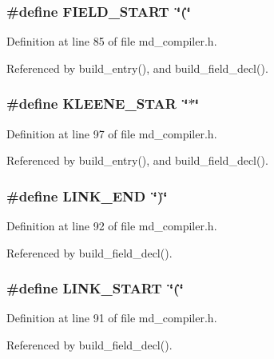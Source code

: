 \subsubsection{\setlength{\rightskip}{0pt plus 5cm}\#define FIELD\_\-START~\char`\"{}(\char`\"{}}\label{md__compiler_8h_7fbfa64753ca50463cbe92c1f585fa3b}




Definition at line 85 of file md\_\-compiler.h.

Referenced by build\_\-entry(), and build\_\-field\_\-decl().
\subsubsection{\setlength{\rightskip}{0pt plus 5cm}\#define KLEENE\_\-STAR~\char`\"{}$\ast$\char`\"{}}\label{md__compiler_8h_a32f5750538c8896fc03c7f60baf8a46}




Definition at line 97 of file md\_\-compiler.h.

Referenced by build\_\-entry(), and build\_\-field\_\-decl().
\subsubsection{\setlength{\rightskip}{0pt plus 5cm}\#define LINK\_\-END~\char`\"{})\char`\"{}}\label{md__compiler_8h_51e12815879251fd7ab9d0133b8866c6}




Definition at line 92 of file md\_\-compiler.h.

Referenced by build\_\-field\_\-decl().
\subsubsection{\setlength{\rightskip}{0pt plus 5cm}\#define LINK\_\-START~\char`\"{}(\char`\"{}}\label{md__compiler_8h_230377f04a83fc1294f21bf7ddbf02d7}




Definition at line 91 of file md\_\-compiler.h.

Referenced by build\_\-field\_\-decl().
